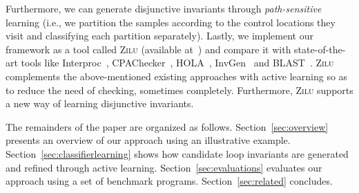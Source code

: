 Furthermore, we can generate disjunctive invariants through {\em path-sensitive} learning (i.e., we partition the samples according to the control locations they visit and classifying each partition separately). Lastly, we implement our framework as a tool called \textsc{Zilu} (available at~\cite{zilu:repo}) and compare it with state-of-the-art tools like Interproc~\cite{jeannet2010interproc}, CPAChecker~\cite{DBLP:conf/cav/BeyerK11}, HOLA~\cite{}, InvGen~\cite{} and BLAST~\cite{}.
\textsc{Zilu} complements the above-mentioned existing approaches with active learning so as to reduce the need of checking, sometimes completely. Furthermore, \textsc{Zilu} supports a new way of learning disjunctive invariants.





The remainders of the paper are organized as follows.
Section~\ref{sec:overview} presents an overview of our approach using an illustrative example.
Section~\ref{sec:classifierlearning} shows how candidate loop invariants are generated and refined through active learning.
Section~\ref{sec:evaluations} evaluates our approach using a set of benchmark programs.
Section~\ref{sec:related} concludes.


